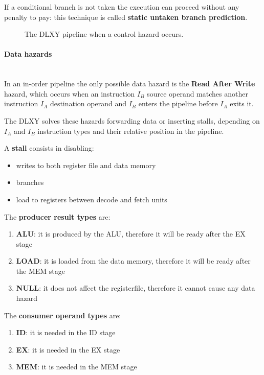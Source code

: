 \bigskip
If a conditional branch is not taken the execution can proceed without any
penalty to pay: this technique is called \textbf{static untaken branch prediction}.

\begin{figure}[H]
	\centering
	\caption{The DLXY pipeline when a control hazard occurs.}
	\label{fig:ctrl_hazard}
\end{figure}

\paragraph{Data hazards} \mbox{} \\
In an in-order pipeline the only possible data hazard is the \textbf{Read After
Write} hazard, which occurs when an instruction $I_B$ source operand matches
another instruction $I_A$ destination operand and $I_B$ enters the pipeline
before $I_A$ exits it.

\bigskip
The DLXY solves these hazards forwarding data or inserting stalls, depending on
$I_A$ and $I_B$ instruction types and their relative position in the pipeline.

\bigskip
A \textbf{stall} consists in disabling:
\begin{itemize}
	\item writes to both register file and data memory
	\item branches
	\item load to registers between decode and fetch units
\end{itemize}

\bigskip
The \textbf{producer result types} are:
\begin{enumerate}
	\item \textbf{ALU}: it is produced by the ALU, therefore it will be
		ready after the EX stage
	\item \textbf{LOAD}: it is loaded from the data memory, therefore it
		will be ready after the MEM stage
	\item \textbf{NULL}: it does not affect the registerfile, therefore it
		cannot cause any data hazard
\end{enumerate}

\bigskip
The \textbf{consumer operand types} are:
\begin{enumerate}
	\item \textbf{ID}: it is needed in the ID stage
	\item \textbf{EX}: it is needed in the EX stage
	\item \textbf{MEM}: it is needed in the MEM stage
\end{enumerate}

